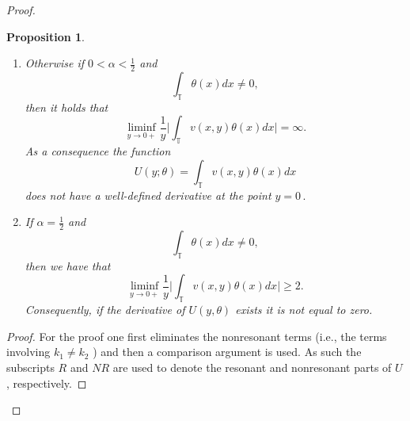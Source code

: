 \documentclass[12pt,a4paper]{article}
\newtheorem{proposition}[theorem]{Proposition}
\theoremstyle{definition}
\theoremstyle{remark}
\numberwithin{equation}{section}
\begin{document}
\begin{proof}
\begin{proposition}
\begin{enumerate}
\item Otherwise if $0 < \alpha < \frac{1}{2}$ and
\begin{equation}
\int_{\mathbb{T}} \theta(x) dx \not=0,
\end{equation}
then it holds that
$$
\liminf _{y \rightarrow 0 +} \frac1{y } \bigg\lvert \int_{\mathbb{T}} v (x,y) \theta (x)dx \bigg\rvert =\infty.
$$
As a consequence the function
\begin{equation}
U(y; \theta) = \int_{\mathbb{T}} v (x,y) \theta (x)dx
\end{equation}
does not have a well-defined derivative at the point $y=0\,.$ 
\item If $\alpha = \frac{1}{2}$ and 
\begin{equation}
\int_{\mathbb{T}} \theta(x) dx \not=0,
\end{equation}
then we have that
\begin{equation}
\liminf _{y \rightarrow 0 +} \frac1{y } \bigg\lvert \int_{\mathbb{T}} v (x,y) \theta (x)dx \bigg\rvert \geq 2.
\end{equation}
Consequently, if the derivative of $U(y,\theta)$ exists it is not equal to zero.
\end{enumerate}
\end{proposition}
\begin{proof}
For the proof one first eliminates the nonresonant terms (i.e., the terms involving $k_1\not=k_2$ ) and then a comparison argument is used. As such the subscripts $R$ and $NR$ are used to denote the resonant and nonresonant parts of $U$, respectively.


\end{proof}
\end{proof}
\end{document}
